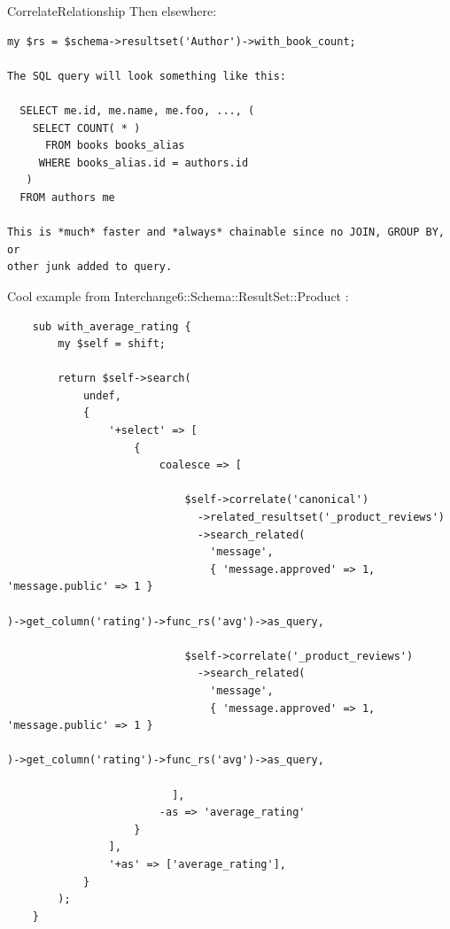 \begin{frame}[fragile]{CorrelateRelationship}
Then elsewhere:

\begin{lstlisting}
my $rs = $schema->resultset('Author')->with_book_count;

The SQL query will look something like this:

  SELECT me.id, me.name, me.foo, ..., (
    SELECT COUNT( * )
      FROM books books_alias
     WHERE books_alias.id = authors.id
   )
  FROM authors me

This is *much* faster and *always* chainable since no JOIN, GROUP BY, or
other junk added to query.
\end{lstlisting}
\end{frame}

Cool example from Interchange6::Schema::ResultSet::Product :

\begin{lstlisting}
    sub with_average_rating {
        my $self = shift;

        return $self->search(
            undef,
            {
                '+select' => [
                    {
                        coalesce => [

                            $self->correlate('canonical')
                              ->related_resultset('_product_reviews')
                              ->search_related(
                                'message',
                                { 'message.approved' => 1,
'message.public' => 1 }
                             
)->get_column('rating')->func_rs('avg')->as_query,

                            $self->correlate('_product_reviews')
                              ->search_related(
                                'message',
                                { 'message.approved' => 1,
'message.public' => 1 }
                             
)->get_column('rating')->func_rs('avg')->as_query,

                          ],
                        -as => 'average_rating'
                    }
                ],
                '+as' => ['average_rating'],
            }
        );
    }
\end{lstlisting}

